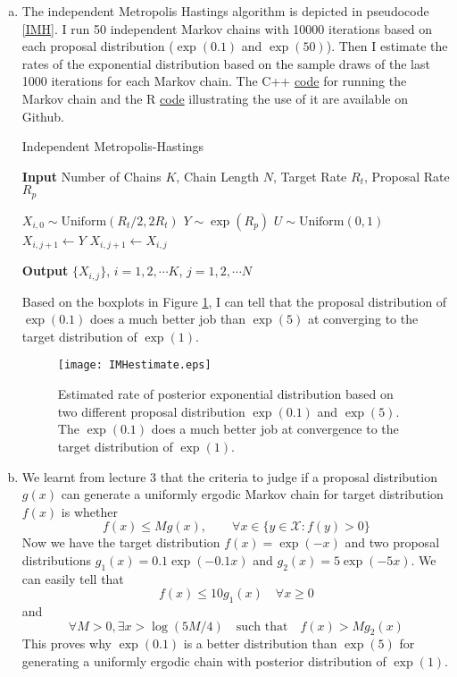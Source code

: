 \documentclass[12pt]{article}
\begin{document}
\begin{enumerate}[(a)]
	\item The independent Metropolis Hastings algorithm is depicted in pseudocode \ref{IMH}. I run 50 independent Markov chains with 10000 iterations based on each proposal distribution ($\exp(0.1)$ and $\exp(50)$). Then I estimate the rates of the exponential distribution based on the sample draws of the last 1000 iterations for each Markov chain. The C++ \href{https://github.com/mkbwang/BIOSTAT882/blob/master/HW1/P4.cpp}{code} for running the Markov chain and the R \href{https://github.com/mkbwang/BIOSTAT882/blob/master/HW1/P4.R}{code} illustrating the use of it are available on Github. 
	
	\begin{algorithm}
		\caption{Independent Metropolis-Hastings}\label{IMH}
		\hspace*{\algorithmicindent} \textbf{Input} Number of Chains $K$, Chain Length $N$, Target Rate $R_{t}$, Proposal Rate $R_{p}$
		\begin{algorithmic}[1]
			\State $X_{i,0} \sim \text{Uniform}(R_t/2, 2R_t)$
			\State $Y \sim \exp (R_p)$
			\State $U \sim \text{Uniform}(0, 1)$
			\State $X_{i,j+1}\gets Y$
			\Else
			\State $X_{i,j+1}\gets X_{i,j}$
			\EndIf
			\EndFor
			\EndFor
		\end{algorithmic}
		\hspace*{\algorithmicindent} \textbf{Output} $\{ X_{i,j}\}$, $i=1,2,\cdots K$, $j=1,2,\cdots N$
	\end{algorithm}
	
	
	Based on the boxplots in Figure \ref{IMHperformance}, I can tell that the proposal distribution of $\exp(0.1)$ does a much better job than $\exp(5)$ at converging to the target distribution of $\exp(1)$.
	
	\begin{figure}[htbp]
		\centering
		\texttt{[image: IMHestimate.eps]}
		\caption{Estimated rate of posterior exponential distribution based on two different proposal distribution $\exp(0.1)$ and $\exp(5)$. The $\exp(0.1)$ does a much better job at convergence to the target distribution of $\exp(1)$.}\label{IMHperformance}
	\end{figure}

	\item We learnt from lecture 3 that the criteria to judge if a proposal distribution $g(x)$ can generate a uniformly ergodic Markov chain for target distribution $f(x)$ is whether
	\[ f(x) \leq Mg(x), \qquad \forall x \in \{ y\in \mathcal{X}: f(y)>0 \} \]
	Now we have the target distribution $f(x) = \exp(-x)$ and two proposal distributions $g_1(x) = 0.1\exp(-0.1x)$ and $g_2(x)=5\exp(-5x)$. We can easily tell that 
	\[ f(x)\leq 10g_1(x)\quad \forall x\geq 0 \]
	and 
	\[ \forall M>0, \exists x>\log(5M/4)\quad \text{such that}\quad f(x) > Mg_2(x) \]
	This proves why $\exp(0.1)$ is a better distribution than $\exp(5)$ for generating a uniformly ergodic chain with posterior distribution of $\exp(1)$.
\end{enumerate}
\end{document}
